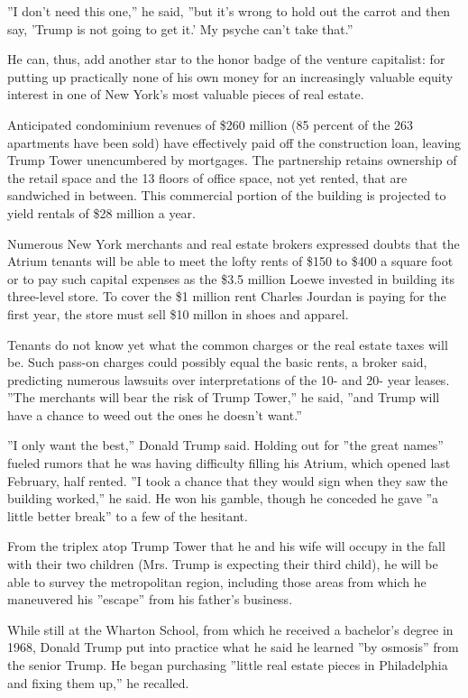 ''I don't need this one,'' he said, ''but it's wrong to hold out the
carrot and then say, 'Trump is not going to get it.' My psyche can't
take that.''

He can, thus, add another star to the honor badge of the venture
capitalist: for putting up practically none of his own money for an
increasingly valuable equity interest in one of New York's most valuable
pieces of real estate.

Anticipated condominium revenues of \$260 million (85 percent of the 263
apartments have been sold) have effectively paid off the construction
loan, leaving Trump Tower unencumbered by mortgages. The partnership
retains ownership of the retail space and the 13 floors of office space,
not yet rented, that are sandwiched in between. This commercial portion
of the building is projected to yield rentals of \$28 million a year.

Numerous New York merchants and real estate brokers expressed doubts
that the Atrium tenants will be able to meet the lofty rents of \$150 to
\$400 a square foot or to pay such capital expenses as the \$3.5 million
Loewe invested in building its three-level store. To cover the \$1
million rent Charles Jourdan is paying for the first year, the store
must sell \$10 millon in shoes and apparel.

Tenants do not know yet what the common charges or the real estate taxes
will be. Such pass-on charges could possibly equal the basic rents, a
broker said, predicting numerous lawsuits over interpretations of the
10- and 20- year leases. ''The merchants will bear the risk of Trump
Tower,'' he said, ''and Trump will have a chance to weed out the ones he
doesn't want.''

''I only want the best,'' Donald Trump said. Holding out for ''the great
names'' fueled rumors that he was having difficulty filling his Atrium,
which opened last February, half rented. ''I took a chance that they
would sign when they saw the building worked,'' he said. He won his
gamble, though he conceded he gave ''a little better break'' to a few of
the hesitant.

From the triplex atop Trump Tower that he and his wife will occupy in
the fall with their two children (Mrs. Trump is expecting their third
child), he will be able to survey the metropolitan region, including
those areas from which he maneuvered his ''escape'' from his father's
business.

While still at the Wharton School, from which he received a bachelor's
degree in 1968, Donald Trump put into practice what he said he learned
''by osmosis'' from the senior Trump. He began purchasing ''little real
estate pieces in Philadelphia and fixing them up,'' he recalled.

